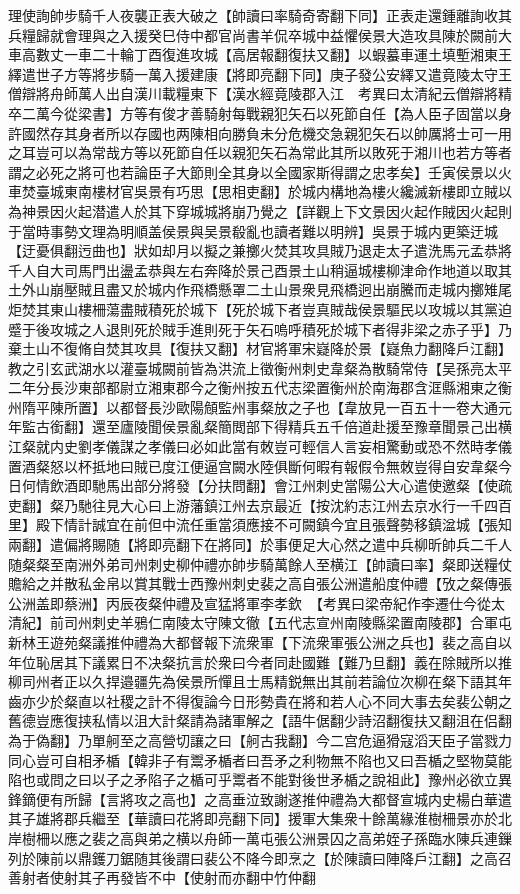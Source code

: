 理使詢帥步騎千人夜襲正表大破之【帥讀曰率騎奇寄翻下同】正表走還鍾離詢收其兵糧歸就會理與之入援癸巳侍中都官尚書羊侃卒城中益懼侯景大造攻具陳於闕前大車高數丈一車二十輪丁酉復進攻城【高居報翻復扶又翻】以蝦蟇車運土填塹湘東王繹遣世子方等將步騎一萬入援建康【將即亮翻下同】庚子發公安繹又遣竟陵太守王僧辯將舟師萬人出自漢川載糧東下【漢水經竟陵郡入江　考異曰太清紀云僧辯將精卒二萬今從梁書】方等有俊才善騎射每戰親犯矢石以死節自任【為人臣子固當以身許國然存其身者所以存國也两陳相向勝負未分危機交急親犯矢石以帥厲將士可一用之耳豈可以為常哉方等以死節自任以親犯矢石為常此其所以敗死于湘川也若方等者謂之必死之將可也若論臣子大節則全其身以全國家斯得謂之忠孝矣】壬寅侯景以火車焚臺城東南樓材官吳景有巧思【思相吏翻】於城内構地為樓火纔滅新樓即立賊以為神景因火起潜遣人於其下穿城城將崩乃覺之【詳觀上下文景因火起作賊因火起則于當時事勢文理為明順盖侯景與吴景殽亂也讀者難以明辨】吳景于城内更築迂城【迂憂俱翻迃曲也】狀如却月以擬之兼擲火焚其攻具賊乃退走太子遣洗馬元孟恭將千人自大司馬門出盪孟恭與左右奔降於景己酉景土山稍逼城樓柳津命作地道以取其土外山崩壓賊且盡又於城内作飛橋懸罩二土山景衆見飛橋迥出崩騰而走城内擲雉尾炬焚其東山樓柵蕩盡賊積死於城下【死於城下者豈真賊哉侯景驅民以攻城以其黨迫蹙于後攻城之人退則死於賊手進則死于矢石嗚呼積死於城下者得非梁之赤子乎】乃棄土山不復脩自焚其攻具【復扶又翻】材官將軍宋嶷降於景【嶷魚力翻降戶江翻】教之引玄武湖水以灌臺城闕前皆為洪流上徵衡州刺史韋粲為散騎常侍【吴孫亮太平二年分長沙東部都尉立湘東郡今之衡州按五代志梁置衡州於南海郡含洭縣湘東之衡州隋平陳所置】以都督長沙歐陽頠監州事粲放之子也【韋放見一百五十一卷大通元年監古銜翻】還至廬陵聞侯景亂粲簡閲部下得精兵五千倍道赴援至豫章聞景己出横江粲就内史劉孝儀謀之孝儀曰必如此當有敇豈可輕信人言妄相驚動或恐不然時孝儀置酒粲怒以杯抵地曰賊已度江便逼宫闕水陸俱斷何暇有報假令無敇豈得自安韋粲今日何情飲酒即馳馬出部分將發【分扶問翻】會江州刺史當陽公大心遣使邀粲【使疏吏翻】粲乃馳往見大心曰上游藩鎮江州去京最近【按沈約志江州去京水行一千四百里】殿下情計誠宜在前但中流任重當須應接不可闕鎮今宜且張聲勢移鎮湓城【張知兩翻】遣偏將賜随【將即亮翻下在將同】於事便足大心然之遣中兵柳昕帥兵二千人随粲粲至南洲外弟司州刺史柳仲禮亦帥步騎萬餘人至横江【帥讀曰率】粲即送糧仗贍給之并散私金帛以賞其戰士西豫州刺史裴之高自張公洲遣船度仲禮【攷之粲傳張公洲盖即蔡洲】丙辰夜粲仲禮及宣猛將軍李孝欽　【考異曰梁帝紀作李遷仕今從太清紀】前司州刺史羊鴉仁南陵太守陳文徹【五代志宣州南陵縣梁置南陵郡】合軍屯新林王遊苑粲議推仲禮為大都督報下流衆軍【下流衆軍張公洲之兵也】裴之高自以年位恥居其下議累日不决粲抗言於衆曰今者同赴國難【難乃旦翻】義在除賊所以推柳司州者正以久捍邉疆先為侯景所憚且士馬精鋭無出其前若論位次柳在粲下語其年齒亦少於粲直以社稷之計不得復論今日形勢貴在將和若人心不同大事去矣裴公朝之舊德豈應復挟私情以沮大計粲請為諸軍解之【語牛倨翻少詩沼翻復扶又翻沮在侣翻為于偽翻】乃單舸至之高營切讓之曰【舸古我翻】今二宫危逼猾寇滔天臣子當戮力同心豈可自相矛楯【韓非子有鬻矛楯者曰吾矛之利物無不陷也又曰吾楯之堅物莫能陷也或問之曰以子之矛陷子之楯可乎鬻者不能對後世矛楯之說祖此】豫州必欲立異鋒鏑便有所歸【言將攻之高也】之高垂泣致謝遂推仲禮為大都督宣城内史楊白華遣其子雄將郡兵繼至【華讀曰花將即亮翻下同】援軍大集衆十餘萬緣淮樹柵景亦於北岸樹柵以應之裴之高與弟之横以舟師一萬屯張公洲景囚之高弟姪子孫臨水陳兵連鏁列於陳前以鼎鑊刀鋸随其後謂曰裴公不降今即烹之【於陳讀曰陣降戶江翻】之高召善射者使射其子再發皆不中【使射而亦翻中竹仲翻